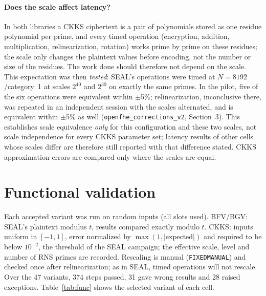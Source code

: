 \documentclass[11pt]{article}
\begin{document}
\paragraph{Does the scale affect latency?} In both libraries a CKKS ciphertext is a pair of polynomials stored as one residue polynomial per prime, and every timed operation (encryption, addition, multiplication, relinearization, rotation) works prime by prime on these residues; the scale only changes the plaintext values before encoding, not the number or size of the residues. The work done should therefore not depend on the scale. This expectation was then \emph{tested}: SEAL's operations were timed at $N{=}8192$/category~1 at scales $2^{40}$ and $2^{30}$ on exactly the same primes. In the pilot, five of the six operations were equivalent within $\pm$5\%; relinearization, inconclusive there, was repeated in an independent session with the scales alternated, and is equivalent within $\pm$5\% as well (\texttt{openfhe\_corrections\_v2}, Section~3). This establishes scale equivalence \emph{only} for this configuration and these two scales, not scale independence for every CKKS parameter set; latency results of other cells whose scales differ are therefore still reported with that difference stated. CKKS approximation errors are compared only where the scales are equal.

\section{Functional validation}
\label{sec:func}

Each accepted variant was run on random inputs (all slots used). BFV/BGV: SEAL's plaintext modulus $t$, results compared exactly modulo $t$. CKKS: inputs uniform in $[-1, 1]$, error normalized by $\max(1, |\text{expected}|)$ and required to be below $10^{-2}$, the threshold of the SEAL campaign; the effective scale, level and number of RNS primes are recorded. Rescaling is manual (\texttt{FIXEDMANUAL}) and checked once after relinearization; as in SEAL, timed operations will not rescale. Over the 47 variants, 374 steps passed, 31 gave wrong results and 28 raised exceptions. Table~\ref{tab:func} shows the selected variant of each cell.

{\footnotesize\setlength{\tabcolsep}{2.5pt}
}
\vspace{-6pt}
\end{document}
